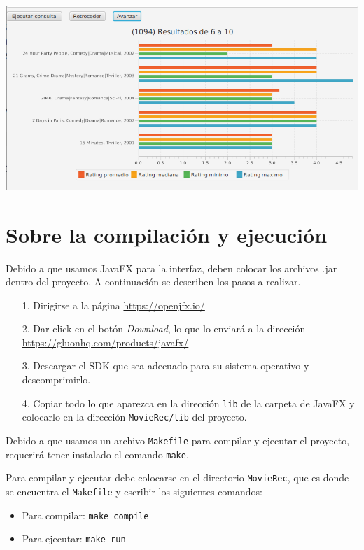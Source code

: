 \documentclass{article}
\begin{document}
\includegraphics[width=\linewidth]{barras}

\section{Sobre la compilación y ejecución}

Debido a que usamos JavaFX para la interfaz, deben colocar los archivos .jar dentro del proyecto. A continuación se describen los pasos a realizar.

\begin{itemize}
\item[1.] Dirigirse a la página \url{https://openjfx.io/}
\item[2.] Dar click en el botón \textit{Download}, lo que lo enviará a la dirección \url{https://gluonhq.com/products/javafx/}
\item[3.] Descargar el SDK que sea adecuado para su sistema operativo y descomprimirlo.
\item[4.] Copiar todo lo que aparezca en la dirección \texttt{lib} de la carpeta de JavaFX y colocarlo en la dirección \texttt{MovieRec/lib} del proyecto.
\end{itemize}

Debido a que usamos un archivo \texttt{Makefile} para compilar y ejecutar el proyecto, requerirá tener instalado el comando \texttt{make}.

Para compilar y ejecutar debe colocarse en el directorio \texttt{MovieRec}, que es donde se encuentra el \texttt{Makefile} y escribir los siguientes comandos:
\begin{itemize}
\item Para compilar: \texttt{make compile}
\item Para ejecutar: \texttt{make run}
\end{itemize}
\end{document}
